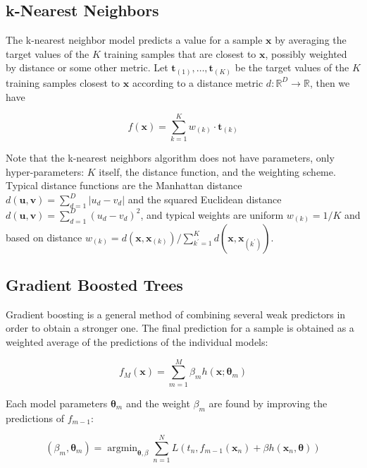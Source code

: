 \documentclass[a4paper]{book}
\DeclareMathOperator*{\argmin}{argmin}
\begin{document}
\subsection{k-Nearest Neighbors}
The k-nearest neighbor model \cite{knn} predicts a value for a sample $\bm x$ by averaging the target values of the $K$ training samples that are closest to $\bm x$, possibly weighted by distance or some other metric. Let $\bm t_{(1)},\ldots,\bm t_{(K)}$ be the target values of the $K$ training samples closest to $\bm x$ according to a distance metric $d:\mathbb{R}^D\rightarrow\mathbb{R}$, then we have

\begin{equation}
f(\bm x)=\sum_{k=1}^K w_{(k)}\cdot\bm t_{(k)}
\end{equation}


Note that the k-nearest neighbors algorithm does not have parameters, only hyper\hyp{}parameters: $K$ itself, the distance function, and the weighting scheme. Typical distance functions are the Manhattan distance $d(\bm u,\bm v)=\sum_{d=1}^D\vert u_d-v_d\vert$ and the squared Euclidean distance $d(\bm u,\bm v)=\sum_{d=1}^D(u_d-v_d)^2$, and typical weights are uniform $w_{(k)}=1/K$ and based on distance $w_{(k)}=d(\bm x,\bm x_{(k)})/\sum_{k^\prime=1}^K d(\bm x,\bm x_{(k^\prime)})$.

\subsection{Gradient Boosted Trees}
Gradient boosting \citep{gradientboosting} is a general method of combining several weak predictors in order to obtain a stronger one. The final prediction for a sample is obtained as a weighted average of the predictions of the individual models:

\begin{equation}
\label{eq:gboost}
f_M(\bm x)=\sum_{m=1}^M \beta_m h(\bm x;\bm\theta_m)
\end{equation}

Each model parameters $\bm\theta_m$ and the weight $\beta_m$ are found by improving the predictions of $f_{m-1}$:

\begin{equation}
\label{eq:gboostjoint}
(\beta_m, \bm\theta_m)=\argmin_{\bm\theta,\beta}\sum_{n=1}^N L\left(
t_n, f_{m-1}(\bm x_n)+\beta h(\bm x_n,\bm\theta)
\right)
\end{equation}
\end{document}
